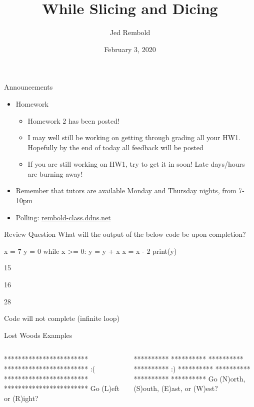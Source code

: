\documentclass[pdf, aspectratio=169, 12pt]{beamer}
\title{While Slicing and Dicing}
\author{Jed Rembold}
\date{February 3, 2020}
\begin{document}
\begin{frame}{Announcements}
	\begin{itemize}
		\item Homework
			\begin{itemize}
				\item Homework 2 has been posted!
				\item I may well still be working on getting through grading all your HW1. Hopefully by the end of today all feedback will be posted
				\item If you are still working on HW1, try to get it in soon! Late days/hours are burning away!
			\end{itemize}
		\item Remember that tutors are available Monday and Thursday nights, from 7-10pm
		\item Polling: \url{rembold-class.ddns.net}
	\end{itemize}
\end{frame}


\begin{frame}[fragile]{Review Question}
	\vspace{4mm}
	What will the output of the below code be upon completion?
	\begin{pythoncode}
		x = 7
		y = 0
		while x >= 0:
			y = y + x
			x = x - 2
		print(y)
	\end{pythoncode}
	\begin{poll}
		\item 15
		\item 16
		\item 28
		\item Code will not complete (infinite loop)
	\end{poll}
\end{frame}

\begin{frame}[fragile]{Lost Woods Examples}
	\begin{columns}
		\begin{pythoncode}[style=output,]
			************************
			************************
						:(
			************************
			************************
			Go (L)eft or (R)ight?
		\end{pythoncode}
		
		\begin{pythoncode}[style=output,]
			**********     **********
			**********     **********
						 :)
			**********     **********
			**********     **********
			Go (N)orth, (S)outh, 
			(E)ast, or (W)est?
		\end{pythoncode}
	\end{columns}
\end{frame}
\end{document}
